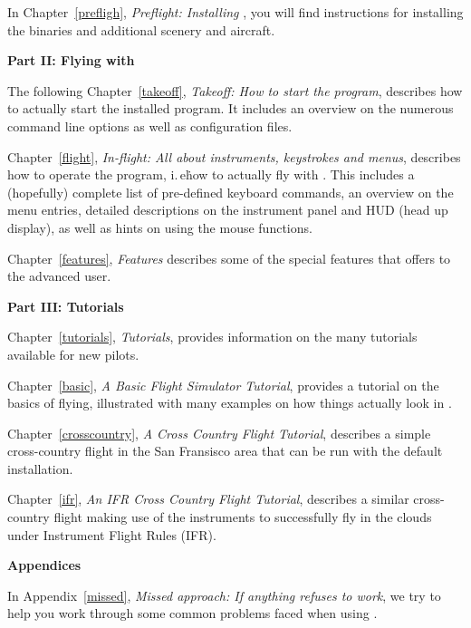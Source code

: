  \noindent
In Chapter~\ref{prefligh}, \textit{Preflight: Installing \FlightGear{}}, you will find
instructions for installing the binaries and additional scenery and aircraft. 
 \medskip

\noindent
\textbf{Part II: Flying with \FlightGear{}}
\medskip

 \noindent
  The following Chapter~\ref{takeoff}, \textit{Takeoff: How to start
  the program}, describes how to actually start the installed program.
  It includes an overview on the numerous command line options as well
  as configuration files.
 \medskip

 \noindent
  Chapter~\ref{flight}, \textit{In-flight: All about instruments,
  keystrokes and menus}, describes how to operate the program, i.\,e\.
  how to actually fly with \FlightGear{}\hspace{-1mm}. This includes a
  (hopefully) complete list of pre-defined keyboard commands, an
  overview on the menu entries, detailed descriptions on the instrument
  panel and HUD (head up display), as well as hints on using the mouse
  functions.
 \medskip

 \noindent
  Chapter~\ref{features}, \textit{Features} describes some of the special
  features that \FlightGear{} offers to the advanced user.
 \medskip

\noindent
\textbf{Part III: Tutorials}
\medskip

 \noindent
 Chapter~\ref{tutorials}, \textit{Tutorials},
provides information on the many tutorials available for new pilots.
 \medskip

 \noindent
 Chapter~\ref{basic}, \textit{A Basic Flight Simulator Tutorial},
provides a tutorial on the basics of flying, illustrated with many
examples on how things actually look in \FlightGear{}.
 \medskip

 \noindent
 Chapter~\ref{crosscountry}, \textit{A Cross Country Flight Tutorial},
describes a simple cross-country flight in the San Fransisco area that
can be run with the default installation.
 \medskip

 \noindent
 Chapter~\ref{ifr}, \textit{An IFR Cross Country Flight Tutorial},
describes a similar cross-country flight making use of the instruments to 
successfully fly in the clouds under Instrument Flight Rules (IFR).
 \medskip

\noindent
\textbf{Appendices}
\medskip

 \noindent
  In Appendix~\ref{missed}, \textit{Missed approach: If anything refuses to work},
   we try to help you work through some common problems faced when using \FlightGear{}.
 \medskip

